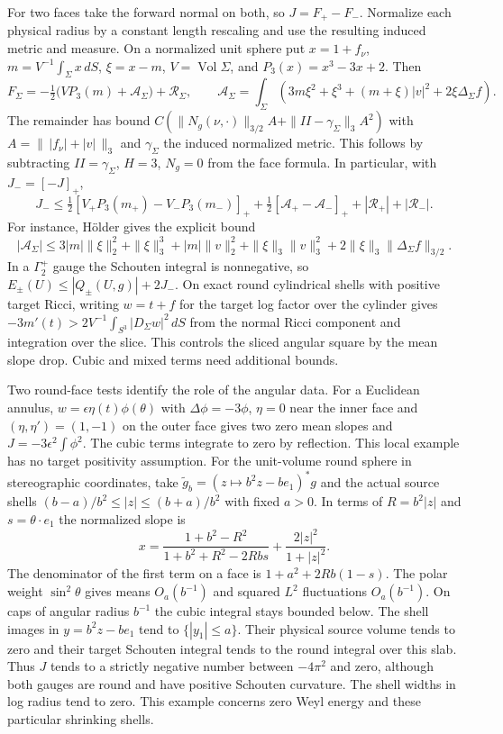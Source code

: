 \documentclass[11pt]{article}
\theoremstyle{definition}
\theoremstyle{remark}
\begin{document}
For two faces take the forward normal on both, so \(J=F_+-F_-\). Normalize each physical radius by a constant length rescaling and use the resulting induced metric and measure. On a normalized unit sphere put \(x=1+f_\nu\), \(m=V^{-1}\int_\Sigma x\,dS\), \(\xi=x-m\), \(V=\operatorname{Vol}\Sigma\), and \(P_3(x)=x^3-3x+2\). Then
\[
 F_\Sigma=-\tfrac12\big(VP_3(m)+\mathcal A_\Sigma\big)+\mathcal R_\Sigma,\qquad
 \mathcal A_\Sigma=\int_\Sigma(3m\xi^2+\xi^3+(m+\xi)|v|^2+2\xi\Delta_\Sigma f).
\]
The remainder has bound \(C(\|N_g(\nu,\cdot)\|_{3/2}A+\|II-\gamma_\Sigma\|_3 A^2)\) with \(A=\|\,|f_\nu|+|v|\,\|_3\) and \(\gamma_\Sigma\) the induced normalized metric. This follows by subtracting \(II=\gamma_\Sigma\), \(H=3\), \(N_g=0\) from the face formula. In particular, with \(J_-=[-J]_+\),
\[
 J_-\le \tfrac12[ V_+P_3(m_+)-V_-P_3(m_-) ]_+
      +\tfrac12[\mathcal A_+-\mathcal A_-]_+ +|\mathcal R_+|+|\mathcal R_-|.
\]
For instance, H\"older gives the explicit bound
\[
 |\mathcal A_\Sigma|\le
 3|m|\|\xi\|_2^2+\|\xi\|_3^3+|m|\|v\|_2^2+
 \|\xi\|_3\|v\|_3^2+2\|\xi\|_3\|\Delta_\Sigma f\|_{3/2}.
\] In a \(\Gamma_2^+\) gauge the Schouten integral is nonnegative, so \(E_\pm(U)\le |Q_\pm(U,g)|+2J_-\). On exact round cylindrical shells with positive target Ricci, writing \(w=t+f\) for the target log factor over the cylinder gives \(-3m'(t)>2 V^{-1}\int_{S^3}|D_\Sigma w|^2\,dS\) from the normal Ricci component and integration over the slice. This controls the sliced angular square by the mean slope drop. Cubic and mixed terms need additional bounds.

Two round-face tests identify the role of the angular data. For a Euclidean annulus, \(w=\epsilon\eta(t)\phi(\theta)\) with \(\Delta\phi=-3\phi\), \(\eta=0\) near the inner face and \((\eta,\eta')=(1,-1)\) on the outer face gives two zero mean slopes and \(J=-3\epsilon^2\int\phi^2\). The cubic terms integrate to zero by reflection. This local example has no target positivity assumption. For the unit-volume round sphere in stereographic coordinates, take \(\widetilde g_b=(z\mapsto b^2z-be_1)^*g\) and the actual source shells \((b-a)/b^2\le|z|\le(b+a)/b^2\) with fixed \(a>0\). In terms of \(R=b^2|z|\) and \(s=\theta\cdot e_1\) the normalized slope is
\[
 x=\frac{1+b^2-R^2}{1+b^2+R^2-2Rb s}+\frac{2|z|^2}{1+|z|^2}.
\]
The denominator of the first term on a face is \(1+a^2+2Rb(1-s)\). The polar weight \(\sin^2\theta\) gives means \(O_a(b^{-1})\) and squared \(L^2\) fluctuations \(O_a(b^{-1})\). On caps of angular radius \(b^{-1}\) the cubic integral stays bounded below. The shell images in \(y=b^2z-be_1\) tend to \(\{|y_1|\le a\}\). Their physical source volume tends to zero and their target Schouten integral tends to the round integral over this slab. Thus \(J\) tends to a strictly negative number between \(-4\pi^2\) and zero, although both gauges are round and have positive Schouten curvature. The shell widths in log radius tend to zero. This example concerns zero Weyl energy and these particular shrinking shells.
\end{document}
